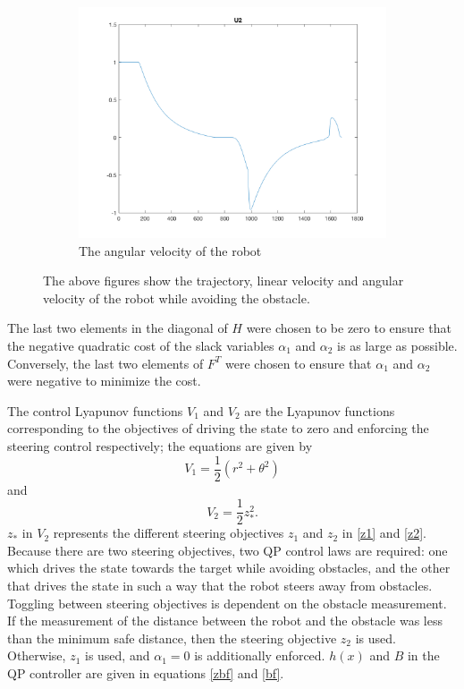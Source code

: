 \documentclass[journal]{IEEEconf}
\begin{document}
\begin{figure}[t!]
\begin{subfigure}[t]{0.32\textwidth}
\includegraphics[scale=0.15]{U2.png} 
\caption{The angular velocity of the robot \label{fig:delta}} 
\end{subfigure}
\caption{The above figures show the trajectory, linear velocity and angular velocity of the robot while avoiding the obstacle.\label{fig:state}}
\end{figure}

The last two elements in the diagonal of $H$ were chosen to be zero to ensure that the negative quadratic cost of the slack variables $\alpha_1$ and $\alpha_2$ is as large as possible. Conversely, the last two elements of $F^T$ were chosen to ensure that $\alpha_1$ and $\alpha_2$ were negative to minimize the cost.

The control Lyapunov functions $V_1$ and $V_2$ are the Lyapunov functions corresponding to the objectives of driving the state to zero and enforcing the steering control respectively; the equations are given by 
\begin{equation}
V_1=\frac{1}{2}(r^2+\theta^2)
\end{equation} and
\begin{equation}
V_2=\frac{1}{2}z_*^2.
\end{equation}
$z_*$ in $V_2$ represents the different steering objectives $z_1$ and $z_2$ in \eqref{z1} and \eqref{z2}. Because there are two steering objectives, two QP control laws are required: one which drives the state towards the target while avoiding obstacles, and the other that drives the state in such a way that the robot steers away from obstacles. Toggling between steering objectives is dependent on the obstacle measurement. If the measurement of the distance between the robot and the obstacle was less than the minimum safe distance, then the steering objective $z_2$ is used. Otherwise, $z_1$ is used, and $\alpha_1=0$ is additionally enforced. $h(x)$ and $B$ in the QP controller are given in equations \eqref{zbf} and \eqref{bf}. 
\end{document}
